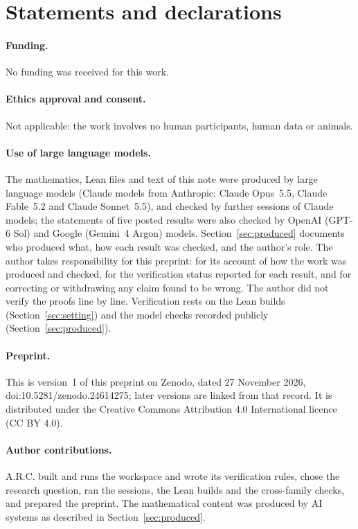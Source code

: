 \documentclass[11pt,a4paper]{article}
\theoremstyle{plain}
\begin{document}
\section*{Statements and declarations}

\paragraph{Funding.} No funding was received for this work.

\paragraph{Ethics approval and consent.} Not applicable: the work involves no human participants, human data or animals.

\paragraph{Use of large language models.} The mathematics, Lean files and text of this note were produced by large language models (Claude models from Anthropic: Claude Opus~5.5, Claude Fable~5.2 and Claude Sonnet~5.5), and checked by further sessions of Claude models; the statements of five posted results were also checked by OpenAI (GPT-6 Sol) and Google (Gemini~4 Argon) models. Section~\ref{sec:produced} documents who produced what, how each result was checked, and the author's role. The author takes responsibility for this preprint: for its account of how the work was produced and checked, for the verification status reported for each result, and for correcting or withdrawing any claim found to be wrong. The author did not verify the proofs line by line. Verification rests on the Lean builds (Section~\ref{sec:setting}) and the model checks recorded publicly (Section~\ref{sec:produced}).

\paragraph{Preprint.} This is version~1 of this preprint on Zenodo, dated 27 November 2026, doi:10.5281/zenodo.24614275; later versions are linked from that record. It is distributed under the Creative Commons Attribution 4.0 International licence (CC BY 4.0).

\paragraph{Author contributions.} A.R.C. built and runs the workspace and wrote its verification rules, chose the research question, ran the sessions, the Lean builds and the cross-family checks, and prepared the preprint. The mathematical content was produced by AI systems as described in Section~\ref{sec:produced}.
\end{document}
